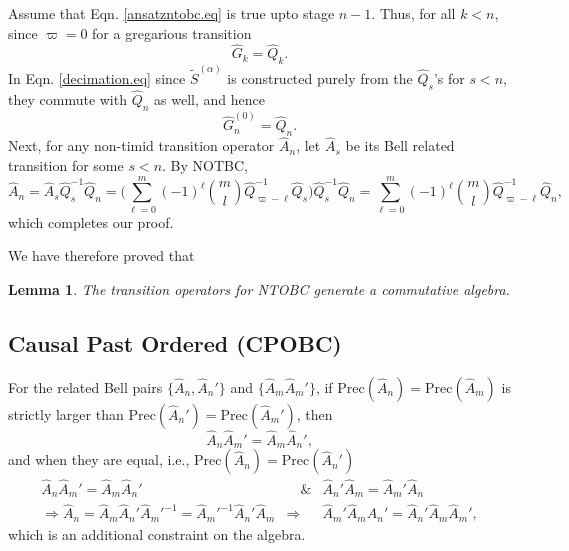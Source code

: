 \documentclass[11pt]{article}
\newtheorem{lemma}[theorem]{Lemma}
\newcommand{\hA}{\hat { A}}
\newcommand{\hG}{\hat G}
\newcommand{\hQ}{\hat Q}
\newcommand{\pre}{\mathrm{Prec}}
\newcommand{\h}{\hat}
\newcommand{\tS}{\tilde S}
\begin{document}
Assume that Eqn. \eqref{ansatzntobc.eq} is true upto stage
 $n-1$. Thus, for all $k<n$,  since $\varpi=0$ for a gregarious
 transition 
 \begin{equation}
\hG_{k}= \h Q_k. 
\end{equation}
In Eqn. \ref{decimation.eq}  since $\tS^{(\alpha)}$ is constructed
purely from the $\h Q_{s}$'s for $s<n$, they commute with  $\hQ_n$ as
well, and hence 
\begin{equation}
\hG_n^{(0)}= \hQ_n. 
\end{equation} 
   Next, for any non-timid transition operator $\hA_n$, let $\hA_s$ be
   its Bell related transition for some $s<n$.  By NOTBC, 
   \begin{equation}
\hA_n=\hA_s \hQ_s^{-1}  \hQ_n= \biggl(\sum_{\ell=0}^m (-1)^\ell \binom{m}{l} \hQ_{\varpi - \ell}
^{-1} \hQ_s \biggr) \hQ_s^{-1}  \hQ_n =  \sum_{\ell=0}^m (-1)^\ell \binom{m}{l} \hQ_{\varpi - \ell}
^{-1} \hQ_n,  
\end{equation} 
which completes our proof.

We have therefore proved that

\begin{lemma} 
The transition operators for NTOBC generate a commutative algebra.  
\end{lemma}









 
 



 


\subsection{Causal Past Ordered (CPOBC)}
\label{cpobc.ssec}

For the related {Bell pairs} $\{\hA_n,\hA_n'\} $ and $\{\hA_m\hA_m' \}
$,  if $\pre(\hA_n)=\pre(\hA_m)$   is strictly larger than
$\pre(\hA_n')=\pre(\hA_m')$, then 
\begin{equation}
\hA_n\hA_m'=\hA_m\hA_n', 
\end{equation}
and when they are equal, i.e.,  $\pre(\hA_n)=\pre(\hA_n')$ 
\begin{eqnarray}
  \hA_n\hA_m' = \hA_m\hA_n' &\quad \& & \hA_n'\hA_m= \hA_m'\hA_n
                                         \nonumber \\ 
 \Rightarrow     \hA_n = \hA_m\hA_n'  \hA_m'^{-1}=  \hA_m'^{-1}
  \hA_n'\hA_m                & \Rightarrow &   \hA_m'\hA_m \hA_n'  =  
  \hA_n'\hA_m \hA_m', 
\end{eqnarray}
which is an additional constraint on the algebra.
\end{document}
